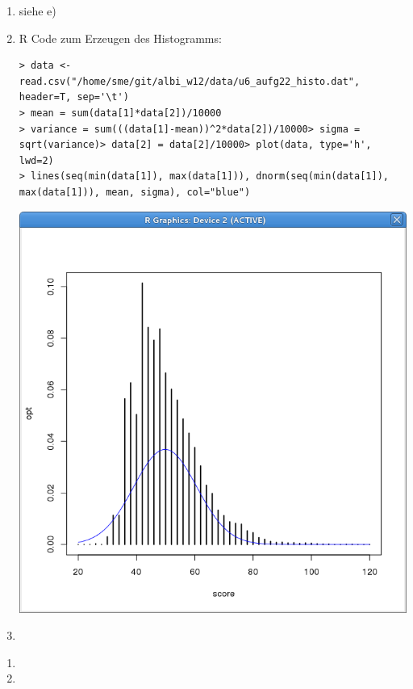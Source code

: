 \documentclass{homework}
\begin{document}
\begin{enumerate}
\begin{enumerate}
\item siehe e)
\item 
	R Code zum Erzeugen des Histogramms:
	\begin{verbatim}
> data <- read.csv("/home/sme/git/albi_w12/data/u6_aufg22_histo.dat", header=T, sep='\t')
> mean = sum(data[1]*data[2])/10000
> variance = sum(((data[1]-mean))^2*data[2])/10000> sigma = sqrt(variance)> data[2] = data[2]/10000> plot(data, type='h', lwd=2)
> lines(seq(min(data[1]), max(data[1])), dnorm(seq(min(data[1]), max(data[1])), mean, sigma), col="blue")
	\end{verbatim}
	\includegraphics[scale=0.5]{../data/u6_aufg22}
\item 
\end{enumerate}


\begin{enumerate}
\item
\item
\end{enumerate}

\end{enumerate}
\end{document}
